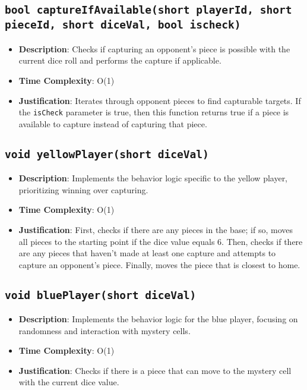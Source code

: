\documentclass{article}
\begin{document}
\subsection{\texttt{bool captureIfAvailable(short playerId, short pieceId, short diceVal, bool ischeck)}}
\begin{itemize}
    \item \textbf{Description}: Checks if capturing an opponent's piece is possible with the current dice roll and performs the capture if applicable.
    \item \textbf{Time Complexity}: O(1)
    \item \textbf{Justification}: Iterates through opponent pieces to find capturable targets. If the \texttt{isCheck} parameter is true, then this function returns true if a piece is available to capture instead of capturing that piece.
\end{itemize}

\subsection{\texttt{void yellowPlayer(short diceVal)}}
\begin{itemize}
    \item \textbf{Description}: Implements the behavior logic specific to the yellow player, prioritizing winning over capturing.
    \item \textbf{Time Complexity}: O(1)
    \item \textbf{Justification}: First, checks if there are any pieces in the base; if so, moves all pieces to the starting point if the dice value equals 6. Then, checks if there are any pieces that haven't made at least one capture and attempts to capture an opponent's piece. Finally, moves the piece that is closest to home.
\end{itemize}

\subsection{\texttt{void bluePlayer(short diceVal)}}
\begin{itemize}
    \item \textbf{Description}: Implements the behavior logic for the blue player, focusing on randomness and interaction with mystery cells.
    \item \textbf{Time Complexity}: O(1)
    \item \textbf{Justification}: Checks if there is a piece that can move to the mystery cell with the current dice value.
\end{itemize}
\end{document}
